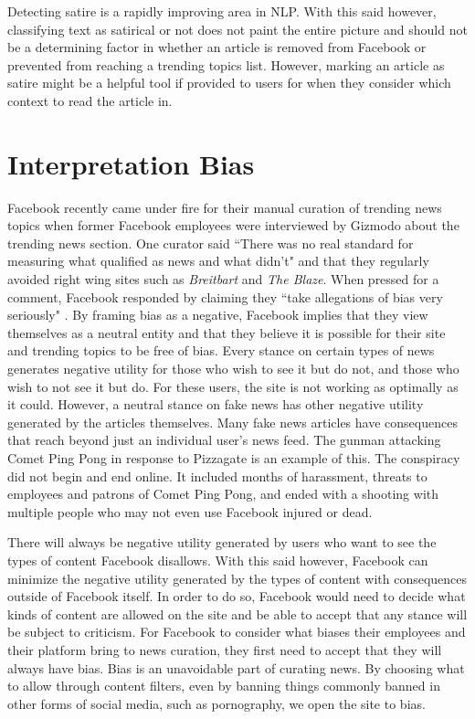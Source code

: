 \documentclass[12pt]{article}
\begin{document}
Detecting satire is a rapidly improving area in NLP. With this said however, classifying text as satirical or not does not paint the entire picture and should not be a determining factor in whether an article is removed from Facebook or prevented from reaching a trending topics list. However, marking an article as satire might be a helpful tool if provided to users for when they consider which context to read the article in.


\section{Interpretation Bias}
Facebook recently came under fire for their manual curation of trending news topics when former Facebook employees were interviewed by Gizmodo about the trending news section. One curator said ``There was no real standard for measuring what qualified as news and what didn't" and that they regularly avoided right wing sites such as \textit{Breitbart} and \textit{The Blaze}. When pressed for a comment, Facebook responded by claiming they ``take allegations of bias very seriously" \citep{gizmodo_fb_news_curation}. By framing bias as a negative, Facebook implies that they view themselves as a neutral entity and that they believe it is possible for their site and trending topics to be free of bias. Every stance on certain types of news generates negative utility for those who wish to see it but do not, and those who wish to not see it but do. For these users, the site is not working as optimally as it could. However, a neutral stance on fake news has other negative utility generated by the articles themselves. Many fake news articles have consequences that reach beyond just an individual user's news feed. The gunman attacking Comet Ping Pong in response to Pizzagate is an example of this. The conspiracy did not begin and end online. It included months of harassment, threats to employees and patrons of Comet Ping Pong, and ended with a shooting with multiple people who may not even use Facebook injured or dead.

There will always be negative utility generated by users who want to see the types of content Facebook disallows. With this said however, Facebook can minimize the negative utility generated by the types of content with consequences outside of Facebook itself. In order to do so, Facebook would need to decide what kinds of content are allowed on the site and be able to accept that any stance will be subject to criticism. For Facebook to consider what biases their employees and their platform bring to news curation, they first need to accept that they will always have bias. Bias is an unavoidable part of curating news. By choosing what to allow through content filters, even by banning things commonly banned in other forms of social media, such as pornography, we open the site to bias.
\end{document}
